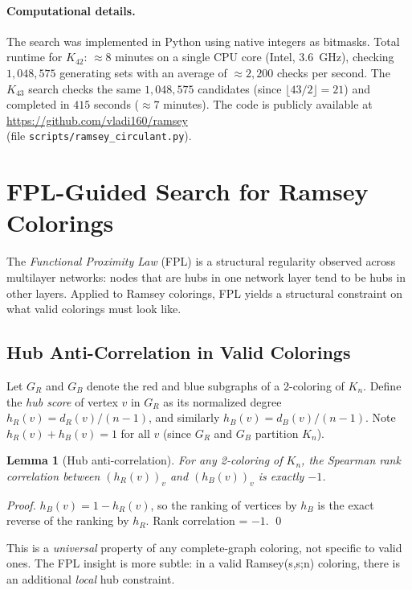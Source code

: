 \documentclass[11pt]{article}
\newtheorem{lemma}[theorem]{Lemma}
\begin{document}
\paragraph{Computational details.}
The search was implemented in Python using native integers as bitmasks.
Total runtime for $K_{42}$: $\approx 8$ minutes on a single CPU core (Intel, 3.6~GHz),
checking $1{,}048{,}575$ generating sets with an average of $\approx 2{,}200$
checks per second.
The $K_{43}$ search checks the same $1{,}048{,}575$ candidates (since
$\lfloor 43/2\rfloor = 21$) and completed in $415$ seconds ($\approx 7$ minutes).
The code is publicly available at \url{https://github.com/vladi160/ramsey}\\
(file \texttt{scripts/ramsey\_circulant.py}).

\section{FPL-Guided Search for Ramsey Colorings}
\label{sec:fpl}

The \emph{Functional Proximity Law} (FPL) \cite{fpl2024} is a structural
regularity observed across multilayer networks: nodes that are hubs in one
network layer tend to be hubs in other layers. Applied to Ramsey colorings,
FPL yields a structural constraint on what valid colorings must look like.

\subsection{Hub Anti-Correlation in Valid Colorings}

Let $G_R$ and $G_B$ denote the red and blue subgraphs of a 2-coloring of $K_n$.
Define the \emph{hub score} of vertex $v$ in $G_R$ as its normalized degree
$h_R(v) = d_R(v)/(n-1)$, and similarly $h_B(v) = d_B(v)/(n-1)$.
Note $h_R(v) + h_B(v) = 1$ for all $v$ (since $G_R$ and $G_B$ partition $K_n$).

\begin{lemma}[Hub anti-correlation]
For any 2-coloring of $K_n$, the Spearman rank correlation between
$(h_R(v))_v$ and $(h_B(v))_v$ is exactly $-1$.
\end{lemma}

\begin{proof}
$h_B(v) = 1 - h_R(v)$, so the ranking of vertices by $h_B$ is the exact
reverse of the ranking by $h_R$. Rank correlation = $-1$. \qed
\end{proof}

This is a \emph{universal} property of any complete-graph coloring, not
specific to valid ones. The FPL insight is more subtle: in a valid
Ramsey(s,s;n) coloring, there is an additional \emph{local} hub constraint.
\end{document}
